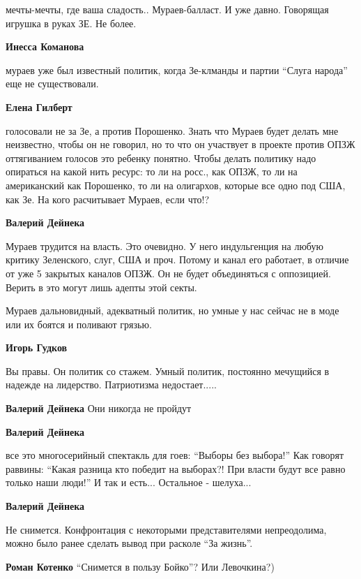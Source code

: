 \begin{itemize}
\begin{itemize}
мечты-мечты, где ваша сладость..
Мураев-балласт. И уже давно. Говорящая игрушка в руках ЗЕ. Не более.

\textbf{Инесса Команова}

мураев уже был известный политик, когда Зе-клманды и партии \enquote{Слуга народа} еще
не существовали.

\textbf{Елена Гилберт} 

голосовали не за Зе, а против Порошенко. Знать что Мураев будет делать мне
неизвестно, чтобы он не говорил, но то что он участвует в проекте против ОПЗЖ
оттягиванием голосов это ребенку понятно. Чтобы делать политику надо опираться
на какой нить ресурс: то ли на росс., как ОПЗЖ, то ли на американский как
Порошенко, то ли на олигархов, которые все одно под США, как Зе. На кого
расчитывает Мураев, если что!?

\textbf{Валерий Дейнека} 

Мураев трудится на власть. Это очевидно.
У него индульгенция на любую критику Зеленского, слуг, США и проч.
Потому и канал его работает, в отличие от уже 5 закрытых каналов ОПЗЖ.
Он не будет объединяться с оппозицией.
Верить в это могут лишь адепты этой секты.


Мураев дальновидный, адекватный политик, но умные у нас сейчас не в моде или их
боятся и поливают грязью.

\textbf{Игорь Гудков}

Вы правы. Он политик со стажем. Умный политик, постоянно мечущийся в надежде на
лидерство. Патриотизма недостает.....

\textbf{Валерий Дейнека} Они никогда не пройдут

\textbf{Валерий Дейнека} 

все это многосерийный спектакль для гоев: \enquote{Выборы без выбора!}
Как говорят раввины: \enquote{Какая разница кто победит на выборах?! При власти будут все равно только наши люди!}
И так и есть... Остальное - шелуха...

\textbf{Валерий Дейнека} 

Не снимется. Конфронтация с некоторыми представителями непреодолима, можно было
ранее сделать вывод при расколе \enquote{За жизнь}.

\textbf{Роман Котенко} \enquote{Снимется в пользу Бойко}? Или Левочкина?)


\end{itemize}
\end{itemize}
